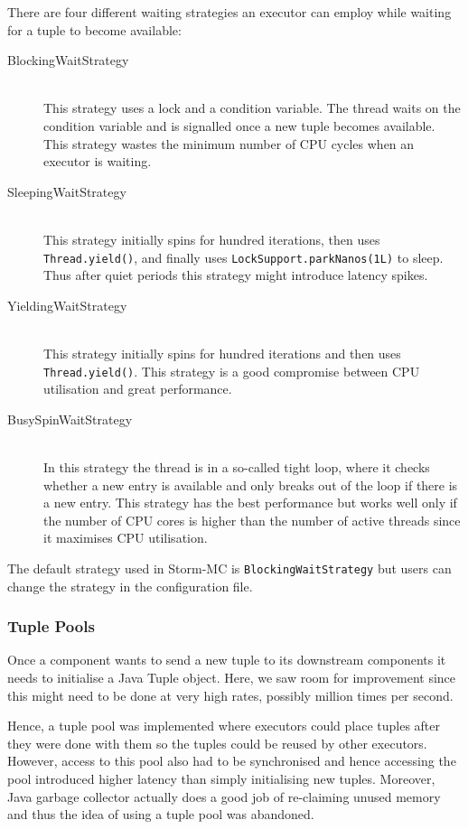 \documentclass[bsc,logo,frontabs,twoside,singlespacing,normalheadings,parskip]{infthesis}\usepackage[]{graphicx}\usepackage[]{color}
\begin{document}
There are four different waiting strategies an executor can employ while waiting for a tuple to become available:

\begin{description}
	\item[BlockingWaitStrategy] \hfill \\
	This strategy uses a lock and a condition variable. The thread waits on the condition variable and is signalled once a new tuple becomes available. This strategy wastes the minimum number of CPU cycles when an executor is waiting.
	\item[SleepingWaitStrategy] \hfill \\
	This strategy initially spins for hundred iterations, then uses \texttt{Thread.yield()}, and finally uses \texttt{LockSupport.parkNanos(1L)} to sleep. Thus after quiet periods this strategy might introduce latency spikes.
	\item[YieldingWaitStrategy] \hfill \\
	This strategy initially spins for hundred iterations and then uses \texttt{Thread.yield()}. This strategy is a good compromise between CPU utilisation and great performance.
	\item[BusySpinWaitStrategy] \hfill \\
	In this strategy the thread is in a so-called tight loop, where it checks whether a new entry is available and only breaks out of the loop if there is a new entry. This strategy has the best performance but works well only if the number of CPU cores is higher than the number of active threads since it maximises CPU utilisation.
\end{description}

The default strategy used in Storm-MC is \texttt{BlockingWaitStrategy} but users can change the strategy in the configuration file.

\subsubsection{Tuple Pools}

Once a component wants to send a new tuple to its downstream components it needs to initialise a Java Tuple object. Here, we saw room for improvement since this might need to be done at very high rates, possibly million times per second.

Hence, a tuple pool was implemented where executors could place tuples after they were done with them so the tuples could be reused by other executors. However, access to this pool also had to be synchronised and hence accessing the pool introduced higher latency than simply initialising new tuples. Moreover, Java garbage collector actually does a good job of re-claiming unused memory and thus the idea of using a tuple pool was abandoned.
\end{document}
